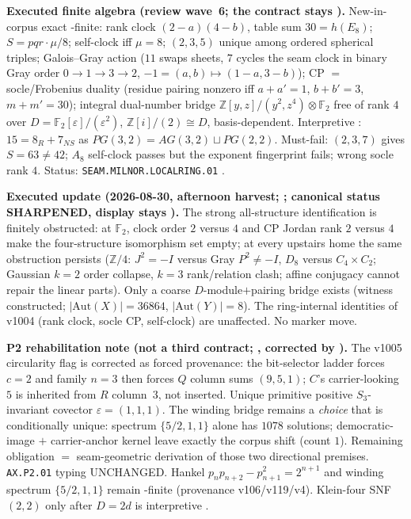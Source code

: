 \par\smallskip\noindent\textbf{Executed finite algebra (review wave~6; the contract stays \mO).}
New-in-corpus exact \mE-finite: rank clock $(2-a)(4-b)$, table sum $30=h(E_8)$;
$S=pqr\cdot\mu/8$; self-clock iff $\mu=8$; $(2,3,5)$ unique among ordered spherical triples;
Galois--Gray action ($11$ swaps sheets, $7$ cycles the seam clock in binary Gray order
$0\to1\to3\to2$, $-1=(a,b)\mapsto(1-a,3-b)$); CP $=$ socle/Frobenius duality (residue pairing
nonzero iff $a+a'=1$, $b+b'=3$, $m+m'=30$); integral dual-number bridge
$\mathbb Z[y,z]/(y^2,z^4)\otimes\mathbb F_2$ free of rank $4$ over
$D=\mathbb F_2[\varepsilon]/(\varepsilon^2)$, $\mathbb Z[i]/(2)\cong D$, basis-dependent.
Interpretive \mC: $15=8_R+7_{NS}$ as $PG(3,2)=AG(3,2)\sqcup PG(2,2)$.
Must-fail: $(2,3,7)$ gives $S=63\neq42$; $A_8$ self-clock passes but the exponent fingerprint
fails; wrong socle rank $4$.
Status: \texttt{SEAM.MILNOR.LOCALRING.01} \mO.

\par\smallskip\noindent\textbf{Executed update (2026-08-30, afternoon harvest;
;
canonical status SHARPENED, display stays \mO).}
The strong all-structure identification is finitely obstructed: at $\mathbb F_2$, clock
order $2$ versus $4$ and CP Jordan rank $2$ versus $4$ make the four-structure isomorphism
set empty; at every upstairs home the same obstruction persists ($\mathbb Z/4$: $J^2=-I$
versus Gray $P^2\neq-I$, $D_8$ versus $C_4\times C_2$; Gaussian $k=2$ order collapse,
$k=3$ rank/relation clash; affine conjugacy cannot repair the linear parts).
Only a coarse $D$-module$+$pairing bridge exists (witness constructed;
$\lvert\mathrm{Aut}(X)\rvert=36864$, $\lvert\mathrm{Aut}(Y)\rvert=8$).
The ring-internal identities of v1004 (rank clock, socle CP, self-clock) are
unaffected.  No marker move.

\par\smallskip\noindent\textbf{P2 rehabilitation note (not a third contract;
,
corrected by ).}
The v1005 circularity flag is corrected as forced provenance: the bit-selector ladder
forces $c=2$ and family $n=3$ then forces $Q$ column sums $(9,5,1)$; $C$'s carrier-looking
$5$ is inherited from $R$ column~$3$, not inserted.  Unique primitive positive
$S_3$-invariant covector $\varepsilon=(1,1,1)$.  The winding bridge remains a
\emph{choice} that is conditionally unique: spectrum $\{5/2,1,1\}$ alone has $1078$
solutions; democratic-image $+$ carrier-anchor kernel leave exactly the corpus shift
(count $1$).  Remaining obligation $=$ seam-geometric derivation of those two
directional premises.  \texttt{AX.P2.01} typing UNCHANGED.  Hankel
$p_n p_{n+2}-p_{n+1}^2=2^{n+1}$ and winding spectrum $\{5/2,1,1\}$ remain \mE-finite
(provenance v106/v119/v4).  Klein-four SNF $(2,2)$ only after $D=2d$ is interpretive \mC.

